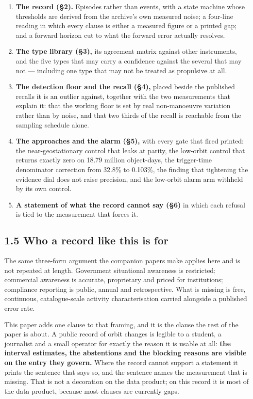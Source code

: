 \documentclass[11pt]{article}
\begin{document}
\begin{enumerate}
\item[1.] \textbf{The record (\S{}2).} Episodes rather than events, with a state machine whose thresholds are derived from the archive's own measured noise; a four-line reading in which every clause is either a measured figure or a printed gap; and a forward horizon cut to what the forward error actually resolves.
\item[2.] \textbf{The type library (\S{}3),} its agreement matrix against other instruments, and the five types that may carry a confidence against the several that may not --- including one type that may not be treated as propulsive at all.
\item[3.] \textbf{The detection floor and the recall (\S{}4),} placed beside the published recalls it is an outlier against, together with the two measurements that explain it: that the working floor is set by real non-manoeuvre variation rather than by noise, and that two thirds of the recall is reachable from the sampling schedule alone.
\item[4.] \textbf{The approaches and the alarm (\S{}5),} with every gate that fired printed: the near-geostationary control that leaks at parity, the low-orbit control that returns exactly zero on 18.79 million object-days, the trigger-time denominator correction from 32.8\% to 0.103\%, the finding that tightening the evidence dial does not raise precision, and the low-orbit alarm arm withheld by its own control.
\item[5.] \textbf{A statement of what the record cannot say (\S{}6)} in which each refusal is tied to the measurement that forces it.
\end{enumerate}

\subsection*{1.5 Who a record like this is for}

The same three-form argument the companion papers make applies here and is not repeated at length. Government situational awareness is restricted; commercial awareness is accurate, proprietary and priced for institutions; compliance reporting is public, annual and retrospective. What is missing is free, continuous, catalogue-scale activity characterisation carried alongside a published error rate.

This paper adds one clause to that framing, and it is the clause the rest of the paper is about. A public record of orbit changes is legible to a student, a journalist and a small operator for exactly the reason it is usable at all: \textbf{the interval estimates, the abstentions and the blocking reasons are visible on the entry they govern.} Where the record cannot support a statement it prints the sentence that says so, and the sentence names the measurement that is missing. That is not a decoration on the data product; on this record it is most of the data product, because most clauses are currently gaps.
\end{document}
